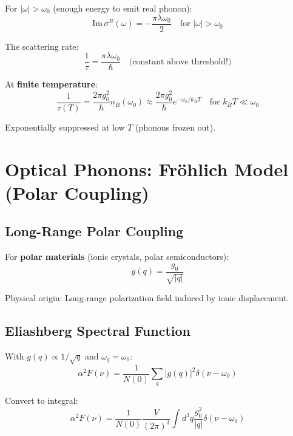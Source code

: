 \documentclass[12pt]{article}
\begin{document}
For $|\omega| > \omega_0$ (enough energy to emit real phonon):
\begin{equation}
\boxed{
\text{Im}\,\sigma^R(\omega) = -\frac{\pi\lambda\omega_0}{2} \quad \text{for } |\omega| > \omega_0
}
\end{equation}

The scattering rate:
\begin{equation}
\boxed{
\frac{1}{\tau} = \frac{\pi\lambda\omega_0}{\hbar} \quad \text{(constant above threshold!)}
}
\end{equation}

At \textbf{finite temperature}:
\begin{equation}
\boxed{
\frac{1}{\tau(T)} = \frac{2\pi g_0^2}{\hbar} n_B(\omega_0) \approx \frac{2\pi g_0^2}{\hbar} e^{-\omega_0/k_B T} \quad \text{for } k_B T \ll \omega_0
}
\end{equation}

Exponentially suppressed at low $T$ (phonons frozen out).

\section{Optical Phonons: Fr\"ohlich Model (Polar Coupling)}

\subsection{Long-Range Polar Coupling}

For \textbf{polar materials} (ionic crystals, polar semiconductors):
\begin{equation}
\boxed{
g(q) = \frac{g_0}{\sqrt{|q|}}
}
\end{equation}

Physical origin: Long-range polarization field induced by ionic displacement.

\subsection{Eliashberg Spectral Function}

With $g(q) \propto 1/\sqrt{q}$ and $\omega_q = \omega_0$:
\begin{equation}
\alpha^2F(\nu) = \frac{1}{N(0)} \sum_q |g(q)|^2 \delta(\nu - \omega_0)
\end{equation}

Convert to integral:
\begin{equation}
\alpha^2F(\nu) = \frac{1}{N(0)} \frac{V}{(2\pi)^3} \int d^3q \frac{g_0^2}{|q|} \delta(\nu - \omega_0)
\end{equation}
\end{document}
